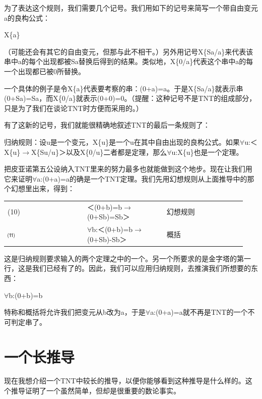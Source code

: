 \documentclass[
  12pt,
  twoside,
  openright,
  oldfontcommands,
]{memoir}
\begin{document}
为了表达这个规则，我们需要几个记号。我们用如下的记号来简写一个带自由变元a的良构公式：

X\{a\}

（可能还会有其它的自由变元，但那与此不相干。）另外用记号X\{Sa/a\}来代表该串中a的每个出现都被Sa替换后得到的结果。类似地，X\{0/a\}代表这个串中a的每一个出现都已被0所替换。

一个具体的例子是令X\{a\}代表要考察的串：(0+a)=a。于是X\{Sa/a\}就表示串(0+Sa)=Sa，而X\{0/a\}就表示(0+0)=0。（提醒：这种记号不是TNT的组成部分，只是为了我们在谈论TNT时方便而采用的。）

有了这新的记号，我们就能很精确地叙述TNT的最后一条规则了：

归纳规则：设u是一个变元，X\{u\}是一个u在其中自由出现的良构公式。如果$\forall$u:＜X\{u\}$\rightarrow$X\{Su/u\}＞以及X\{0/u\}二者都是定理，那么$\forall$u:X\{u\}也是一个定理。

把皮亚诺第五公设纳入TNT里来的努力最多也就能做到这个地步。现在让我们用它来证明$\forall$a:(0+a)=a的确是一个TNT定理。我们先用幻想规则从上面推导中的那个幻想里出来，得到：

\begin{longtable}[]{>{\raggedright\arraybackslash}p{0.313\linewidth} >{\raggedright\arraybackslash}p{0.313\linewidth} >{\raggedright\arraybackslash}p{0.313\linewidth}}
\toprule\noalign{}
\endhead
\bottomrule\noalign{}
\endlastfoot
(10) & ＜(0+b)=b$\rightarrow$(0+Sb)=Sb＞ & 幻想规则 \\
⑾ & $\forall$b:＜(0+b)=b$\rightarrow$(0+Sb)-Sb＞ & 概括 \\
\end{longtable}

这是归纳规则要求输入的两个定理之中的一个。另一个所要求的是金字塔的第一行，这是我们已经有了的。因此，我们可以应用归纳规则，去推演我们所想要的东西：

$\forall$b:(0+b)=b

特称和概括将允许我们把变元从b改为a，于是$\forall$a:(0+a)=a就不再是TNT的一个不可判定串了。

\section{一个长推导}

现在我想介绍一个TNT中较长的推导，以便你能够看到这种推导是什么样的。这个推导证明了一个虽然简单，但却是很重要的数论事实。
\end{document}
